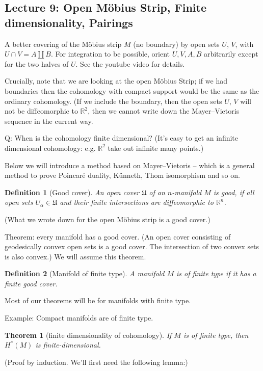\documentclass{article}
\theoremstyle{mystyle}
\newtheorem*{definition}{Definition}%
\newtheorem*{theorem*}{Theorem}
\theoremstyle{remark}
\numberwithin{equation}{section}
\begin{document}
\subsection{Lecture 9: Open Möbius Strip, Finite dimensionality, Pairings}

A better covering of the Möbius strip $M$ (no boundary) by open sets $U$, $V$, with $U\cap V = A\amalg B$. For integration to be possible, orient $U,V,A,B$ arbitrarily except for the two halves of $U$. See the youtube video for details. 

Crucially, note that we are looking at the open Möbius Strip; if we had boundaries then the cohomology with compact support would be the same as the ordinary cohomology. (If we include the boundary, then the open sets $U$, $V$ will not be diffeomorphic to $\mathbb{R}^2$, then we cannot write down the Mayer--Vietoris sequence in the current way.

Q: When is the cohomology finite dimensional? (It's easy to get an infinite dimensional cohomology: e.g. $\mathbb{R}^2$ take out infinite many points.)

Below we will introduce a method based on Mayer--Vietoris -- which is a general method to prove Poincar\'e duality, Künneth, Thom isomorphism and so on.

\begin{definition}[Good cover] An open cover $\mathfrak{U}$ of an $n$-manifold $M$ is \emph{good}, if all open sets $U_\alpha\in \mathfrak{U}$ and their finite intersections are diffeomorphic to $\mathbb{R}^n$. 
\end{definition}

(What we wrote down for the open Möbius strip is a good cover.)

Theorem: every manifold has a good cover. (An open cover consisting of geodesically convex open sets is a good cover. The intersection of two convex sets is also convex.) We will assume this theorem.


\begin{definition}[Manifold of finite type] A manifold $M$ is of \emph{finite type} if it has a finite good cover.
\end{definition}

Most of our theorems will be for manifolds with finite type. 

Example: Compact manifolds are of finite type.


\begin{theorem*}[finite dimensionality of cohomology]
If $M$ is of finite type, then $H^*(M)$ is finite-dimensional.
\end{theorem*}
(Proof by induction. We'll first need the following lemma:)
\end{document}
